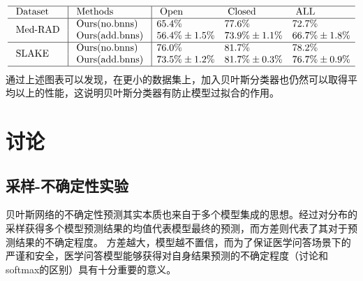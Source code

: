 %
$$
\begin{array}{l|l|lll}
\hline \text { Dataset } & \text { Methods } & \text { Open } & \text { Closed } & \text { ALL } \\
\hline \multirow{2}{*}{\text { Med-RAD }} & \text { Ours(no.bnns) } & 65.4 \% & 77.6 \% & 72.7 \% \\
& \text { Ours(add.bnns) } & 56.4 \% \pm 1.5 \% & 73.9 \% \pm 1.1 \% & 66.7 \% \pm 1.8 \% \\
\hline \multirow{2}{*}{\text { SLAKE }} & \text { Ours(no.bnns) } & 76.0 \% & 81.7 \% & 78.2 \% \\
& \text { Ours(add.bnns) } & 73.5 \% \pm 1.2 \% & 81.7 \% \pm 0.3 \% & 76.7 \% \pm 0.9 \% \\
\hline
\end{array}
$$
通过上述图表可以发现，在更小的数据集上，加入贝叶斯分类器也仍然可以取得平均以上的性能，这说明贝叶斯分类器有防止模型过拟合的作用。

\section{讨论}
\subsection{采样-不确定性实验}
贝叶斯网络的不确定性预测其实本质也来自于多个模型集成的思想。经过对分布的采样获得多个模型预测结果的均值代表模型最终的预测，而方差则代表了其对于预测结果的不确定程度。
方差越大，模型越不置信，而为了保证医学问答场景下的严谨和安全，医学问答模型能够获得对自身结果预测的不确定程度（讨论和softmax的区别）具有十分重要的意义。

